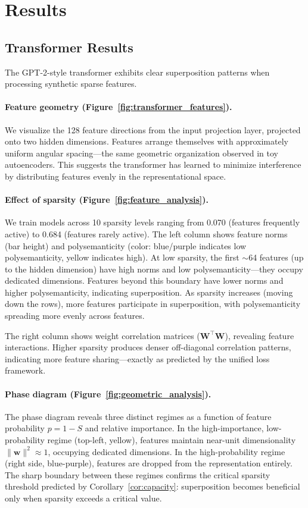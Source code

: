 \section{Results}
\label{sec:results}

\subsection{Transformer Results}

The GPT-2-style transformer exhibits clear superposition patterns when processing synthetic sparse features.

\paragraph{Feature geometry (Figure~\ref{fig:transformer_features}).} We visualize the 128 feature directions from the input projection layer, projected onto two hidden dimensions. Features arrange themselves with approximately uniform angular spacing---the same geometric organization observed in toy autoencoders. This suggests the transformer has learned to minimize interference by distributing features evenly in the representational space.

\paragraph{Effect of sparsity (Figure~\ref{fig:feature_analysis}).} We train models across 10 sparsity levels ranging from 0.070 (features frequently active) to 0.684 (features rarely active). The left column shows feature norms (bar height) and polysemanticity (color: blue/purple indicates low polysemanticity, yellow indicates high). At low sparsity, the first $\sim$64 features (up to the hidden dimension) have high norms and low polysemanticity---they occupy dedicated dimensions. Features beyond this boundary have lower norms and higher polysemanticity, indicating superposition. As sparsity increases (moving down the rows), more features participate in superposition, with polysemanticity spreading more evenly across features.

The right column shows weight correlation matrices ($\mathbf{W}^\top \mathbf{W}$), revealing feature interactions. Higher sparsity produces denser off-diagonal correlation patterns, indicating more feature sharing---exactly as predicted by the unified loss framework.

\paragraph{Phase diagram (Figure~\ref{fig:geometric_analysis}).} The phase diagram reveals three distinct regimes as a function of feature probability $p = 1 - S$ and relative importance. In the high-importance, low-probability regime (top-left, yellow), features maintain near-unit dimensionality $\|\mathbf{w}\|^2 \approx 1$, occupying dedicated dimensions. In the high-probability regime (right side, blue-purple), features are dropped from the representation entirely. The sharp boundary between these regimes confirms the critical sparsity threshold predicted by Corollary~\ref{cor:capacity}: superposition becomes beneficial only when sparsity exceeds a critical value.

